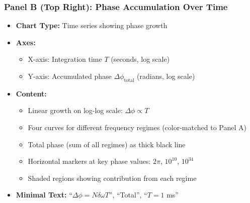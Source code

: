 \subsubsection*{Panel B (Top Right): Phase Accumulation Over Time}
\begin{itemize}
\item \textbf{Chart Type:} Time series showing phase growth
\item \textbf{Axes:}
  \begin{itemize}
  \item X-axis: Integration time $T$ (seconds, log scale)
  \item Y-axis: Accumulated phase $\Delta\phi_{\text{total}}$ (radians, log scale)
  \end{itemize}
\item \textbf{Content:}
  \begin{itemize}
  \item Linear growth on log-log scale: $\Delta\phi \propto T$
  \item Four curves for different frequency regimes (color-matched to Panel A)
  \item Total phase (sum of all regimes) as thick black line
  \item Horizontal markers at key phase values: $2\pi$, $10^{10}$, $10^{34}$
  \item Shaded regions showing contribution from each regime
  \end{itemize}
\item \textbf{Minimal Text:} ``$\Delta\phi = N \delta\omega T$'', ``Total'', ``$T = 1$ ms''
\end{itemize}


